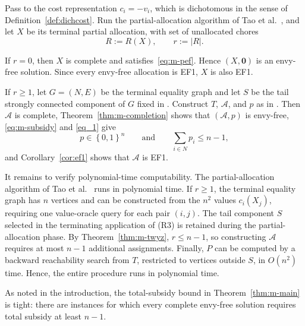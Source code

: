 \documentclass[11pt]{article}
\makeatletter
\theoremstyle{plain}
\theoremstyle{plain}
\renewenvironment{proof}[1][\proofname]{\par
  \pushQED{\qed}%
  \normalfont \topsep6\p@\@plus6\p@\relax
  \trivlist
  \item[\hskip\labelsep\bfseries #1\@addpunct{}]\ignorespaces
}{%
  \popQED\endtrivlist\@endpefalse
}
\newcommand{\agents}{N}                       %
\newcommand{\alloc}{\mathcal{A}}              %
\newcommand{\subsidy}{p}                      %
\newcommand{\cost}{c}
\newcommand{\set}[1]{\left\{#1\right\}}
\newcommand{\abs}[1]{\left\lvert#1\right\rvert}
\makeatother
\begin{document}
\begin{proof}
Pass to the cost representation $\cost_i=-v_i$, which is dichotomous in the sense of Definition~\ref{def:dichcost}. Run the partial-allocation algorithm of Tao et al.~\cite{tao2025existence}, and let $X$ be its terminal partial allocation, with set of unallocated chores
\[ R:=R(X), \qquad r:=\abs R.
\]

If $r=0$, then $X$ is complete and satisfies~\eqref{eq:m-pef}. Hence $(X,\mathbf 0)$ is an envy-free solution. Since every envy-free allocation is EF1, $X$ is also EF1.

If $r\geq 1$, let $G=(\agents,E)$ be the terminal equality graph and let $S$ be the tail strongly connected component of $G$ fixed in . Construct $T$, $\alloc$, and $\subsidy$ as in . Then $\alloc$ is complete, Theorem~\ref{thm:m-completion} shows that $(\alloc,\subsidy)$ is envy-free, \eqref{eq:m-subsidy} and \eqref{eq_1} give \[
    \subsidy\in\set{0,1}^n
    \qquad\text{and}\qquad
    \sum_{i\in\agents}\subsidy_i\leq n-1,
\] and Corollary~\ref{cor:ef1} shows that $\alloc$ is EF1.

It remains to verify polynomial-time computability. The partial-allocation algorithm of Tao et al.~\cite{tao2025existence} runs in polynomial time. If $r\geq 1$, the terminal equality graph has $n$ vertices and can be constructed from the $n^2$ values $\cost_i(X_j)$, requiring one value-oracle query for each pair $(i,j)$. The tail component $S$ selected in the terminating application of \textnormal{(R3)} is retained during the partial-allocation phase.
By Theorem~\ref{thm:m-twyz}, $r\leq n-1$, so constructing $\alloc$ requires at most $n-1$ additional assignments. Finally, $P$ can be computed by a backward reachability search from $T$, restricted to vertices outside $S$, in $O(n^2)$ time. Hence, the entire procedure runs in polynomial time. \end{proof}

As noted in the introduction, the total-subsidy bound in Theorem~\ref{thm:m-main} is tight: there are instances for which every complete envy-free solution requires total subsidy at least \(n-1\).
\end{document}
